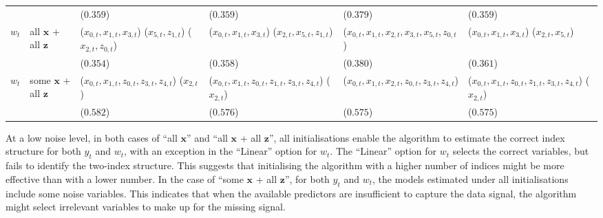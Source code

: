 \documentclass[
  11pt,
  a4paper,
]{article}
\begin{document}
\begin{table}[!h]
{{\begin{tabular}{llllll}
\hspace{1em} &  & ($0.359$) & ($0.359$) & ($0.379$) & ($0.359$)\\
\hspace{1em}$w_{t}$ & all $\bm{x}$ + all $\bm{z}$ & ($x_{0,t}, x_{1,t}, x_{3,t}$) ($x_{5,t}, z_{1,t}$) ($x_{2,t}, z_{0,t}$) & ($x_{0,t}, x_{1,t}, x_{3,t}$) ($x_{2,t}, x_{5,t}, z_{1,t}$) & ($x_{0,t}, x_{1,t}, x_{2,t}, x_{3,t}, x_{5,t}, z_{0,t}$) & ($x_{0,t}, x_{1,t}, x_{3,t}$) ($x_{2,t}, x_{5,t}$)\\
\hspace{1em} &  & ($0.354$) & ($0.358$) & ($0.380$) & ($0.361$)\\
\hspace{1em}$w_{t}$ & some $\bm{x}$ + all $\bm{z}$ & ($x_{0,t}, x_{1,t}, z_{0,t}, z_{3,t}, z_{4,t}$) ($x_{2,t}$) & ($x_{0,t}, x_{1,t}, z_{0,t}, z_{1,t}, z_{3,t}, z_{4,t}$) ($x_{2,t}$) & ($x_{0,t}, x_{1,t}, x_{2,t}, z_{0,t}, z_{3,t}, z_{4,t}$) & ($x_{0,t}, x_{1,t}, z_{0,t}, z_{1,t}, z_{3,t}, z_{4,t}$) ($x_{2,t}$)\\
\hspace{1em} &  & ($0.582$) & ($0.576$) & ($0.575$) & ($0.575$)\\
\bottomrule
\end{tabular}}

}

\end{table}%

At a low noise level, in both cases of ``all \(\bm{x}\)'' and ``all
\(\bm{x}\) + all \(\bm{z}\)'', all initialisations enable the algorithm
to estimate the correct index structure for both \(y_{t}\) and
\(w_{t}\), with an exception in the ``Linear'' option for \(w_{t}\). The
``Linear'' option for \(w_{t}\) selects the correct variables, but fails
to identify the two-index structure. This suggests that initialising the
algorithm with a higher number of indices might be more effective than
with a lower number. In the case of ``some \(\bm{x}\) + all
\(\bm{z}\)'', for both \(y_{t}\) and \(w_{t}\), the models estimated
under all initialisations include some noise variables. This indicates
that when the available predictors are insufficient to capture the data
signal, the algorithm might select irrelevant variables to make up for
the missing signal.
\end{document}
